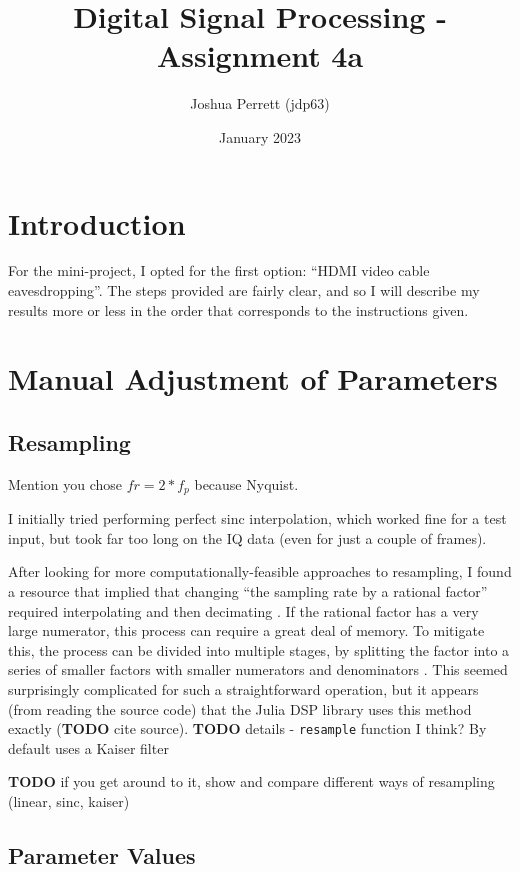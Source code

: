 \documentclass{article}
\title{Digital Signal Processing - Assignment 4a}
\author{Joshua Perrett (jdp63)}
\date{January 2023}
\newcommand*{\code}[1]{\texttt{#1}}
\newcommand*{\TODO}{\textbf{TODO}\xspace}
\begin{document}
\maketitle

\section*{Introduction}

For the mini-project, I opted for the first option: ``HDMI video cable eavesdropping''. The steps provided are fairly clear, and so I will describe my results more or less in the order that corresponds to the instructions given.

\section*{Manual Adjustment of Parameters}

\subsection*{Resampling}

Mention you chose $fr = 2 * f_p$ because Nyquist.

I initially tried performing perfect sinc interpolation, which worked fine for a test input, but took far too long on the IQ data (even for just a couple of frames).


After looking for more computationally-feasible approaches to resampling, I found a resource that implied that changing ``the sampling rate by a rational factor'' required interpolating and then decimating \cite{dspguru-resampling}. If the rational factor has a very large numerator, this process can require a great deal of memory. To mitigate this, the process can be divided into multiple stages, by splitting the factor into a series of smaller factors with smaller numerators and denominators \cite{dspguru-resampling}. This seemed surprisingly complicated for such a straightforward operation, but it appears (from reading the source code) that the Julia DSP library uses this method exactly (\TODO cite source). \TODO details - \code{resample} function I think? By default uses a Kaiser filter

\textbf{TODO} if you get around to it, show and compare different ways of resampling (linear, sinc, kaiser)

\subsection*{Parameter Values}
\end{document}
